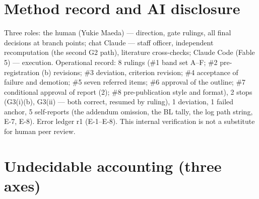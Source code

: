 \documentclass{aa}
\begin{document}
\section{Method record and AI disclosure}
\noindent Three roles: the human (Yukie Maeda) --- direction, gate rulings, all final decisions at branch points; chat Claude --- staff officer, independent recomputation (the second G2 path), literature cross-checks; Claude Code (Fable 5) --- execution. Operational record: 8 rulings (\#1 band set A--F; \#2 pre-registration (b) revisions; \#3 deviation, criterion revision; \#4 acceptance of failure and demotion; \#5 seven referred items; \#6 approval of the outline; \#7 conditional approval of report (2); \#8 pre-publication style and format), 2 stops (G3(i)(b), G3(ii) --- both correct, resumed by ruling), 1 deviation, 1 failed anchor, 5 self-reports (the addendum omission, the BL tally, the log path string, E-7, E-8). Error ledger r1 (E-1--E-8). This internal verification is not a substitute for human peer review.\par\smallskip

\section{Undecidable accounting (three axes)}
\begin{table}\end{table}
\end{document}
